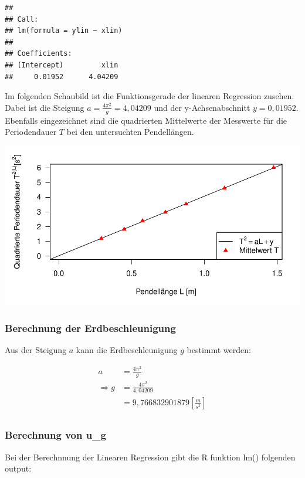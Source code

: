 \documentclass[
  9pt,
]{article}
\begin{document}
\begin{verbatim}
## 
## Call:
## lm(formula = ylin ~ xlin)
## 
## Coefficients:
## (Intercept)         xlin  
##     0.01952      4.04209
\end{verbatim}

Im folgenden Schaubild ist die Funktionsgerade der linearen Regression
zusehen. Dabei ist die Steigung \(a=\frac{4\pi^2}{g}=4,04209\) und der
y-Achsenabschnitt \(y=0,01952\). Ebenfalls eingezeichnet sind die
quadrierten Mittelwerte der Messwerte für die Periodendauer \(T\) bei
den untersuchten Pendellängen.

\includegraphics{Pendel_files/figure-latex/unnamed-chunk-11-1.pdf}

\hypertarget{berechnung-der-erdbeschleunigung}{%
\subsubsection{Berechnung der
Erdbeschleunigung}\label{berechnung-der-erdbeschleunigung}}

Aus der Steigung \(a\) kann die Erdbeschleunigung \(g\) bestimmt werden:

\begin{align*}
a&= \frac{4\pi^2}{g}\\
\Rightarrow g &= \frac{4\pi^2}{4,04209}\\
 &= 9,766832901879 [\frac{m}{s^2}]\\
\end{align*}

\hypertarget{berechnung-von-u_g}{%
\subsubsection{Berechnung von u\_g}\label{berechnung-von-u_g}}

Bei der Berechnnung der Linearen Regression gibt die R funktion lm()
folgenden output:
\end{document}
